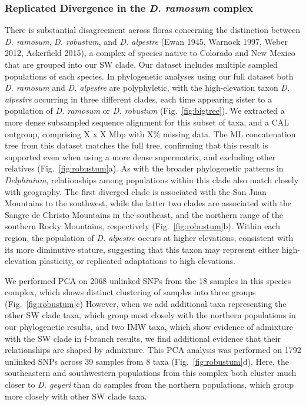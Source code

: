 \documentclass[11pt]{article}
\begin{document}
\subsubsection{Replicated Divergence in the \emph{D. ramosum} complex}
% 
There is substantial disagreement across floras concerning the distinction between 
\emph{D. ramosum}, \emph{D. robustum}, and \emph{D. alpestre} 
(Ewan 1945, Warnock 1997, Weber 2012, Ackerfield 2015), 
a complex of species native to Colorado and New Mexico that are grouped into our
SW clade.
% 
Our dataset includes multiple sampled populations of each species. 
% 
In phylogenetic analyses using our full dataset both \emph{D. ramosum} and 
\emph{D. alpestre} are polyphyletic, with the high-elevation taxon \emph{D. alpestre}
occurring in three different clades, each time appearing sister to a 
population of \emph{D. ramosum} or \emph{D. robustum} (Fig.~\ref{fig:bigtree}). 
% 
We extracted a more dense subsampled sequence alignment for this subset of taxa, 
and a CAL outgroup, comprising X x X Mbp with X\% missing data. The ML concatenation
tree from this dataset matches the full tree, confirming that this result is 
supported even when using a more dense supermatrix, and excluding other relatives
(Fig.~\ref{fig:robustum}a). 
% 
As with the broader phylogenetic patterns in \emph{Delphinium}, relationships
among populations within this clade also match closely with geography.
The first diverged clade is associated with the San Juan Mountains to the southwest,
while the latter two clades are associated with the Sangre de Christo Mountains in 
the southeast, and the northern range of the southern Rocky Mountains, respectively 
(Fig.~\ref{fig:robustum}b). 
%  
Within each region, the population of \emph{D. alpestre} occurs at higher 
elevations, consistent with its more diminutive stature, suggesting that this
taxon may represent either high-elevation plasticity, or replicated adaptations
to high elevations.

% 
We performed PCA on 2068 unlinked SNPs from the 18 samples in this species complex,
which shows distinct clustering of samples into three groups (Fig.~\ref{fig:robustum}c)
% 
However, when we add additional taxa representing the other SW clade taxa, which
group most closely with the northern populations in our phylogenetic results, 
and two IMW taxa, which show evidence of admixture with the SW clade in f-branch
results, we find additional evidence that their relationships are shaped by admixture.
% 
This PCA analysis was performed on 1792 unlinked SNPs across 39 samples from 8 taxa
(Fig.~\ref{fig:robustum}d). 
Here, the southeastern and southwestern populations from this complex both cluster
much closer to \emph{D. geyeri} than do samples from the northern populations, 
which group more closely with other SW clade taxa. 
% 
\end{document}
